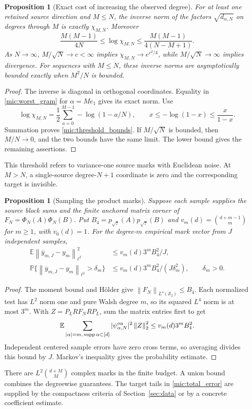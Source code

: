 \documentclass[11pt,a4paper]{amsart}
\numberwithin{equation}{section}
\newtheorem{proposition}[theorem]{Proposition}
\theoremstyle{definition}
\theoremstyle{remark}
\newcommand{\E}{\mathbb E}
\newcommand{\Prob}{\mathbb P}
\newcommand{\Sch}{\mathcal S}
\newcommand{\norm}[1]{\left\lVert#1\right\rVert}
\begin{document}
\begin{proposition}[Exact cost of increasing the observed degree]\label{mic:threshold}
For at least one retained source direction and $M\le N$, the inverse norm of the factors $\sqrt{d_{\alpha,N}}$ on degrees through $M$ is exactly $\chi_{M,N}$. Moreover
\begin{equation}\label{mic:threshold_bounds}
 \frac{M(M-1)}{4N}\le\log\chi_{M,N}
 \le\frac{M(M-1)}{4(N-M+1)}.
\end{equation}
As $N\to\infty$, $M/\sqrt N\to c<\infty$ implies
$\chi_{M,N}\to e^{c^2/4}$, while $M/\sqrt N\to\infty$ implies divergence. For sequences with $M\le N$, these inverse norms are asymptotically bounded exactly when $M^2/N$ is bounded.
\end{proposition}
\begin{proof}
The inverse is diagonal in orthogonal coordinates. Equality in \eqref{mic:worst_gram} for $\alpha=Me_1$ gives its exact norm. Use
\[
 \log\chi_{M,N}=\frac12\sum_{a=0}^{M-1}-\log(1-a/N),\qquad
 x\le-\log(1-x)\le\frac{x}{1-x}.
\]
Summation proves \eqref{mic:threshold_bounds}. If $M/\sqrt N$ is bounded, then $M/N\to0$, and the two bounds have the same limit. The lower bound gives the remaining assertions.
\end{proof}
This threshold refers to variance-one source marks with Euclidean noise. At $M>N$, a single-source degree-$N+1$ coordinate is zero and the corresponding target is invisible.

\begin{proposition}[Sampling the product marks]\label{mic:sampling}
Suppose each sample supplies the source block sums and the finite anchored matrix corner of $F_N=\Phi_N(A)\Phi_N(B)$. Put
$B_4=p_{\sqrt7}(A)p_{\sqrt7}(B)$ and
$v_m(d)=\binom{d+m-1}{m}$ for $m\ge1$, with $v_0(d)=1$.
For the degree-$m$ empirical mark vector from $J$ independent samples,
\begin{equation}\label{mic:sampling_bound}
 \begin{aligned}
 \E\norm{\overline y_{m,J}-y_m}_{\ell^2}^2
 &\le v_m(d)3^mB_4^2/J,\\
 \Prob\{\norm{\overline y_{m,J}-y_m}_{\ell^2}>\delta_m\}
 &\le v_m(d)3^mB_4^2/(J\delta_m^2),\qquad\delta_m>0.
 \end{aligned}
\end{equation}
\end{proposition}
\begin{proof}
The moment bound and H\"older give $\norm{F_N}_{L^4(\Sch_2)}\le B_4$. Each normalized test has $L^2$ norm one and pure Walsh degree $m$, so its squared $L^4$ norm is at most $3^m$. With $Z=P_LRF_NRP_L$, sum the matrix entries first to get
\[
 \E\sum_{|\alpha|=m,\,\operatorname{supp}\alpha\subset[d]}
   |\psi^{\rm on}_{\alpha,N}|^2\norm Z_2^2
 \le v_m(d)3^mB_4^2.
\]
Independent centered sample errors have zero cross terms, so averaging divides this bound by $J$. Markov's inequality gives the probability estimate.
\end{proof}
There are $L^2\binom{d+M}{M}$ complex marks in the finite budget. A union bound combines the degreewise guarantees. The target tails in \eqref{mic:total_error} are supplied by the compactness criteria of Section~\ref{sec:data} or by a concrete coefficient estimate.
\end{document}
